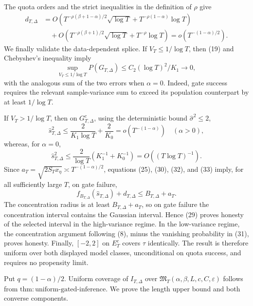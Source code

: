 The quota orders and the strict inequalities in the definition of \(\rho\) give
\[
 \begin{aligned}
 d_{T,\Delta}
 &=O\!\left(T^{-\rho(\beta+1-\alpha)/2}\sqrt{\log T}
 +T^{-\rho(1-\alpha)}\log T\right)\\
 &\quad+O\!\left(T^{-\rho(\beta+1)/2}\sqrt{\log T}
 +T^{-\rho}\log T\right)
 =o(T^{-(1-\alpha)/2}).
 \end{aligned} \tag{30}
\]
We finally validate the data-dependent splice.  If \(V_T\leq1/\log T\), then (19) and Chebyshev's inequality imply
\[
 \sup_{V_T\leq1/\log T}P(G_{T,\Delta})
 \leq C_2(\log T)^2/K_1\longrightarrow0, \tag{31}
\]
with the analogous sum of the two errors when \(\alpha=0\).  Indeed, gate success requires the relevant sample-variance sum to exceed its population counterpart by at least \(1/\log T\).

If \(V_T>1/\log T\), then on \(G_{T,\Delta}^c\), using the deterministic bound \(\widehat\sigma^2\leq2\),
\[
 \widehat s_{T,\Delta}^2
 \leq\frac{2}{K_1\log T}+\frac{2}{K_0}
 =o(T^{-(1-\alpha)})\quad(\alpha>0), \tag{32}
\]
whereas, for \(\alpha=0\),
\[
 \widehat s_{T,\Delta}^2
 \leq\frac{2}{\log T}(K_1^{-1}+K_0^{-1})=O((T\log T)^{-1}). \tag{33}
\]
Since \(a_T=\sqrt{2S_Tx_\eta}\asymp T^{-(1-\alpha)/2}\), equations (25), (30), (32), and (33) imply, for all sufficiently large \(T\), on gate failure,
\[
 f_{B_{T,\Delta}}(\widehat s_{T,\Delta})+d_{T,\Delta}
 \leq B_{T,\Delta}+a_T. \tag{34}
\]
The concentration radius is at least \(B_{T,\Delta}+a_T\), so on gate failure the concentration interval contains the Gaussian interval.  Hence (29) proves honesty of the selected interval in the high-variance regime.  In the low-variance regime, the concentration argument following (8), minus the vanishing probability in (31), proves honesty.  Finally, \([-2,2]\) on \(E_T^c\) covers \(\tau\) identically.  The result is therefore uniform over both displayed model classes, unconditional on quota success, and requires no propensity limit.

Put \(q=(1-\alpha)/2\).  Uniform coverage of \(I_{T,\Delta}\) over \(\mathfrak M_T(\alpha,\beta,L,c,C,\varepsilon)\) follows from \(\mathrm{thm:uniform\text{-}gated\text{-}inference}\).  We prove the length upper bound and both converse components.

